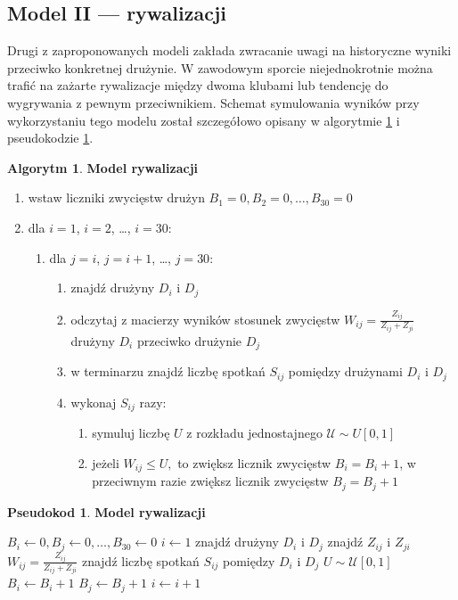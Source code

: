 \documentclass[inzynierska]{pwr_wmat_praca_dyplomowa}
\theoremstyle{plain}
\numberwithin{theorem}{chapter}
\theoremstyle{definition}
\numberwithin{theorem}{chapter}
\newtheorem{algorytm}[theorem]{Algorytm}
\newtheorem{pseudokod}[theorem]{Pseudokod}
\begin{document}
\subsection{Model II --- rywalizacji}
Drugi z zaproponowanych modeli zakłada zwracanie uwagi na historyczne wyniki przeciwko konkretnej drużynie. W zawodowym sporcie niejednokrotnie można trafić na zażarte rywalizacje między dwoma klubami lub tendencję do wygrywania z pewnym przeciwnikiem. Schemat symulowania wyników przy wykorzystaniu tego modelu został szczegółowo opisany w algorytmie \ref{algorytm2} i pseudokodzie \ref{pseudokod2}.

\begin{algorytm} \label{algorytm2}
	\textbf{Model rywalizacji}
	\begin{enumerate}
		\item wstaw liczniki zwycięstw drużyn $B_1= 0,B_2= 0,\dots, B_{30}= 0$
		\item dla $i=1$, $i=2$, \dots, $i=30$: 
		\begin{enumerate}
			\item dla $j=i$, $j=i+1$, \dots, $j=30$: 
			\begin{enumerate}
				\item znajdź drużyny $D_i$ i $D_j$
				\item odczytaj z macierzy wyników stosunek zwycięstw $W_{ij}=\frac{Z_{ij}}{Z_{ij}+Z_{ji}}$ drużyny $D_i$ przeciwko drużynie $D_j$   
				\item w terminarzu znajdź liczbę spotkań $S_{ij}$ pomiędzy drużynami $D_i$ i $D_j$
				\item wykonaj $S_{ij}$ razy:
				\begin{enumerate}
					\item symuluj liczbę $U$ z rozkładu jednostajnego $\mathcal{U}\sim U[0,1]$ 
					\item jeżeli $W_{ij} \leq U,$ to zwiększ licznik zwycięstw $B_i=B_i+1$, w przeciwnym razie zwiększ licznik zwycięstw $B_j=B_j+1$
				\end{enumerate}
			\end{enumerate}
		\end{enumerate}
	\end{enumerate}
\end{algorytm} 

\begin{pseudokod} \label{pseudokod2}
	\textbf{Model rywalizacji}
	\begin{algorithmic}[1]
		\State $B_i\gets 0,B_j\gets 0,\dots, B_{30}\gets 0$
		\State $i\gets 1$
		\State znajdź drużyny $D_i$ i $D_j$
		\State znajdź $Z_{ij}$ i $Z_{ji}$ 
		\State $W_{ij}=\frac{Z_{ij}}{Z_{ij}+Z_{ji}}$
		\State znajdź liczbę spotkań $S_{ij}$ pomiędzy $D_i$ i $D_j$
		\State $U\sim \mathcal{U}[0,1]$
		\State $B_i \gets B_i+1$
		\Else
		\State $B_j \gets B_j+1$
		\EndIf
		\EndFor
		\EndFor
		\State $i\gets i+1$
		\EndWhile
	\end{algorithmic}
\end{pseudokod}
\end{document}
